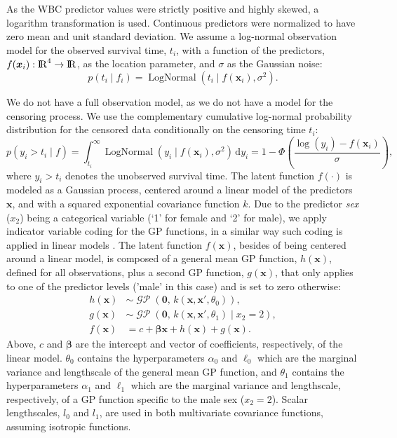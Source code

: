 \documentclass[onecolumn,a4paper,11pt]{article}
\DeclareMathOperator{\LogNormal}{LogNormal}
\DeclareMathOperator{\GP}{\mathcal{GP}}
\begin{document}
As the WBC predictor values were strictly positive and highly skewed, a logarithm transformation is used. Continuous predictors were normalized to have zero mean and unit standard deviation. %
We assume a log-normal observation model for the observed survival time, $t_i$, with a function of the predictors, $f(\bm{x}_i):{\rm I\!R}^4 \to {\rm I\!R}$, as the location parameter, and $\sigma$ as the Gaussian noise: 
%
\begin{equation*}
  p(t_i \mid f_i)= \LogNormal(t_i \mid f(\bm{x}_i),\sigma^2).
\end{equation*}

We do not have a full observation model, as we do not have a model for the censoring process. We use the complementary cumulative log-normal probability distribution for the censored data conditionally on the censoring time $t_i$:
%
\begin{equation*}
p(y_i > t_i \mid f)= \int_{t_i}^{\infty} \LogNormal(y_i \mid f(\bm{x}_i),\sigma^2) \,\mathrm{d}y_i=  1 - \Phi\! \left( \frac{\log(y_i)-f(\bm{x}_i)}{\sigma} \right),
\end{equation*}
%
where $y_i>t_i$ denotes the unobserved survival time.
The latent function $f(\cdot)$ is modeled as a Gaussian process, centered around a linear model of the predictors $\bm{x}$, and with a squared exponential covariance function $k$. Due to the predictor \textit{sex} ($x_2$) being a categorical variable (`1' for female and `2' for male), we apply indicator variable coding for the GP functions, in a similar way such coding is applied in linear models \citep{Gelman+Hill+Vehtari:2020:ROS}. The latent function $f(\bm{x})$, besides of being centered around a linear model, is composed of a general mean GP function, $h(\bm{x})$, defined for all observations, plus a second GP function, $g(\bm{x})$, that only applies to one of the predictor levels ('male' in this case) and is set to zero otherwise:
%
\begin{align*}
h(\bm{x}) &\sim \GP\left(\bm{0}, \, k(\bm{x},\bm{x}', \theta_0) \right),  \\[1pt] 
%
g(\bm{x}) &\sim \GP\left(\bm{0}, \, k(\bm{x},\bm{x}', \theta_1) \mid x_2=2 \right),\\[1pt] 
%
f(\bm{x}) &= c + \bm{\beta} \bm{x} + h(\bm{x}) + g(\bm{x}). 
\end{align*}
%
Above, $c$ and $\bm{\beta}$ are the intercept and vector of coefficients, respectively, of the linear model. $\theta_0$ contains the hyperparameters $\alpha_0$ and $\ell_0$ which are the marginal variance and lengthscale of the general mean GP function, and $\theta_1$ contains the hyperparameters $\alpha_1$ and $\ell_1$ which are the marginal variance and lengthscale, respectively, of a GP function specific to the male sex ($x_2=2$). Scalar lengthscales, $l_0$ and $l_1$, are used in both multivariate covariance functions, assuming isotropic functions.
\end{document}
